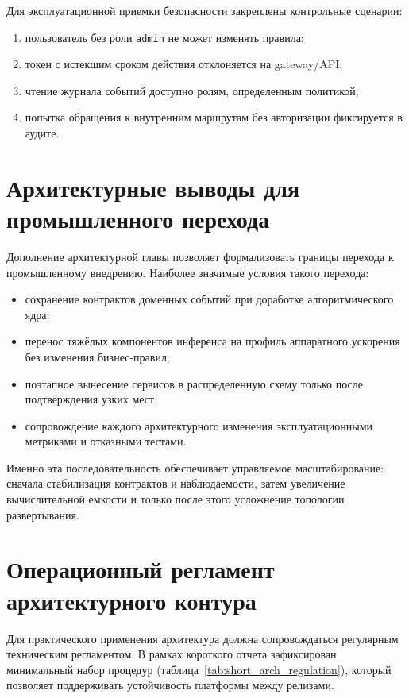 Для эксплуатационной приемки безопасности закреплены контрольные сценарии:
\begin{enumerate}
    \item пользователь без роли \texttt{admin} не может изменять правила;
    \item токен с истекшим сроком действия отклоняется на gateway/API;
    \item чтение журнала событий доступно ролям, определенным политикой;
    \item попытка обращения к внутренним маршрутам без авторизации фиксируется в аудите.
\end{enumerate}

\section{Архитектурные выводы для промышленного перехода}

Дополнение архитектурной главы позволяет формализовать границы перехода к промышленному внедрению. Наиболее значимые условия такого перехода:
\begin{itemize}
    \item сохранение контрактов доменных событий при доработке алгоритмического ядра;
    \item перенос тяжёлых компонентов инференса на профиль аппаратного ускорения без изменения бизнес-правил;
    \item поэтапное вынесение сервисов в распределенную схему только после подтверждения узких мест;
    \item сопровождение каждого архитектурного изменения эксплуатационными метриками и отказными тестами.
\end{itemize}

Именно эта последовательность обеспечивает управляемое масштабирование: сначала стабилизация контрактов и наблюдаемости, затем увеличение вычислительной емкости и только после этого усложнение топологии развертывания.

\section{Операционный регламент архитектурного контура}

Для практического применения архитектура должна сопровождаться регулярным техническим регламентом. В рамках короткого отчета зафиксирован минимальный набор процедур (таблица~\ref{tab:short_arch_regulation}), который позволяет поддерживать устойчивость платформы между релизами.

